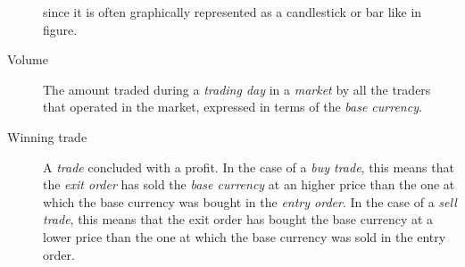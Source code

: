 \begin{description}
		since it is often graphically represented as a candlestick or
		bar like in figure.
	\item[Volume] The amount traded during a \textit{trading day} in a
		\textit{market} by all the traders that operated in the market,
		expressed in terms of the \textit{base currency}.
	\item[Winning trade] A \textit{trade} concluded with a profit. In the
		case of a \textit{buy trade}, this means that the \textit{exit
		order} has sold the \textit{base currency} at an higher price
		than the one at which the base currency was bought in the
		\textit{entry order}. In the case of a \textit{sell trade}, this
		means that the exit order has bought the base currency at a
		lower price than the one at which the base currency was sold in
		the entry order.
\end{description}
